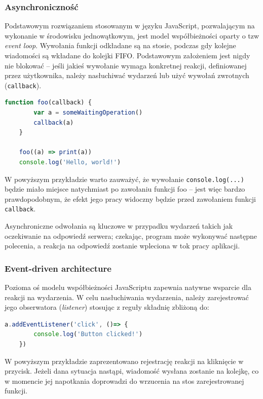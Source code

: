 \subsubsection{Asynchroniczność}
Podstawowym rozwiązaniem stosowanym w języku JavaScript, pozwalającym na wykonanie w środowisku jednowątkowym, jest model współbieżności oparty o tzw {\em event loop}. Wywołania funkcji odkładane są na stosie, podczas gdy kolejne wiadomości są wkładane do kolejki FIFO. Podstawowym założeniem jest nigdy nie blokować -- jeśli jakieś wywołanie wymaga konkretnej reakcji, definiowanej przez użytkownika, należy nasłuchiwać wydarzeń lub użyć wywołań zwrotnych (\texttt{callback}).

\begin{lstlisting}[language=javascript]
    function foo(callback) {
        var a = someWaitingOperation()
        callback(a)
    }

    foo((a) => print(a))
    console.log('Hello, world!')
\end{lstlisting}

W powyższym przykładzie warto zauważyć, że wywołanie \texttt{console.log(...)} będzie miało miejsce natychmiast po zawołaniu funkcji foo -- jest więc bardzo prawdopodobnym, że efekt jego pracy widoczny będzie przed zawołaniem funkcji \texttt{callback}.

Asynchroniczne odwołania są kluczowe w przypadku wydarzeń takich jak oczekiwanie na odpowiedź serwera; czekając, program może wykonywać następne polecenia, a reakcja na odpowiedź zostanie wpleciona w tok pracy aplikacji.

\subsubsection{Event-driven architecture}
Pozioma oś modelu współbieżności JavaScriptu zapewnia natywne wsparcie dla reakcji na wydarzenia. W celu nasłuchiwania wydarzenia, należy zarejestrować jego obserwatora ({\em listener}) stosując z reguły składnię zbliżoną do:
\begin{lstlisting}[language=javascript]
    a.addEventListener('click', ()=> {
        console.log('Button clicked!')
    })
\end{lstlisting}

W powyższym przykładzie zaprezentowano rejestrację reakcji na kliknięcie w przycisk. Jeżeli dana sytuacja nastąpi, wiadomość wysłana zostanie na kolejkę, co w momencie jej napotkania doprowadzi do wrzucenia na stos zarejestrowanej funkcji.

